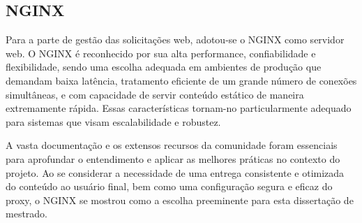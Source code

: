 \subsection{NGINX}
Para a parte de gestão das solicitações web, adotou-se o NGINX como servidor web. O NGINX é reconhecido por sua alta performance, confiabilidade e flexibilidade, sendo uma escolha adequada em ambientes de produção que demandam baixa latência, tratamento eficiente de um grande número de conexões simultâneas, e com capacidade de servir conteúdo estático de maneira extremamente rápida. Essas características tornam-no particularmente adequado para sistemas que visam escalabilidade e robustez. 

A vasta documentação e os extensos recursos da comunidade foram essenciais para aprofundar o entendimento e aplicar as melhores práticas no contexto do projeto. Ao se considerar a necessidade de uma entrega consistente e otimizada do conteúdo ao usuário final, bem como uma configuração segura e eficaz do proxy, o NGINX se mostrou como a escolha preeminente para esta dissertação de mestrado.
